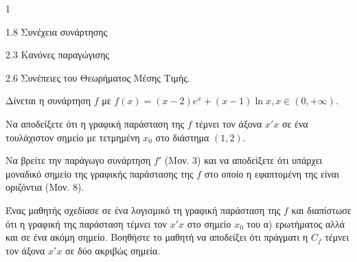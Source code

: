 \begin{ylh}{1}
    \item 1.8 Συνέχεια συνάρτησης
    \item 2.3 Κανόνες παραγώγισης
    \item 2.6 Συνέπειες του Θεωρήματος Μέσης Τιμής.
\end{ylh}
Δίνεται η συνάρτηση $f$ με $f(x) = (x - 2)e^x + (x - 1)\ln x, x \in (0, +\infty)$.
\begin{alist}
\item Να αποδείξετε ότι η γραφική παράσταση της $f$ τέμνει τον άξονα $x'x$ σε ένα τουλάχιστον σημείο με τετμημένη $x_0$ στο διάστημα $(1,2)$. 
\item Να βρείτε την παράγωγο συνάρτηση $f'$ (Μον. 3) και να αποδείξετε ότι υπάρχει μοναδικό σημείο της γραφικής παράστασης της $f$ στο οποίο η εφαπτομένη της είναι οριζόντια (Μον. 8). 
\item Ένας μαθητής σχεδίασε σε ένα λογισμικό τη γραφική παράσταση της $f$ και διαπίστωσε ότι η γραφική της παράσταση τέμνει τον $x'x$ στο σημείο $x_0$ του α) ερωτήματος αλλά και σε ένα ακόμη σημείο. Βοηθήστε το μαθητή να αποδείξει ότι πράγματι η $C_f$ τέμνει τον άξονα $x'x$ σε δύο ακριβώς σημεία. 
\end{alist}